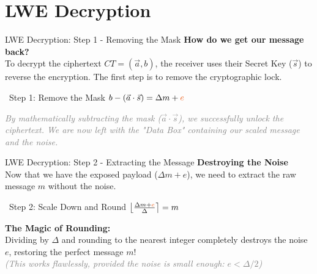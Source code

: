 \documentclass[aspectratio=169, 10pt]{beamer}
\begin{document}
\section{LWE Decryption}
\begin{frame}{LWE Decryption: Step 1 - Removing the Mask}
    \Large
    \textbf{How do we get our message back?} \\
    \vspace{0.2cm}
    \normalsize
    To decrypt the ciphertext ${CT = (\vec{a}, b)}$, the receiver uses their Secret Key ($\vec{s}$) to reverse the encryption. The first step is to remove the cryptographic lock.
    \vspace{0.4cm}
    
    \begin{block}{\faUnlock \ Step 1: Remove the Mask}
        \centering
        \vspace{0.2cm}
        \Large $b - (\vec{a} \cdot \vec{s}) = \Delta m + \textcolor{AccentOrange}{{e}}$
        \vspace{0.2cm}
    \end{block}
    \vspace{0.4cm}
    
    \begin{center}
        \textit{\textcolor{gray}{By mathematically subtracting the mask ($\vec{a} \cdot \vec{s}$), we successfully unlock the ciphertext. We are now left with the "Data Box" containing our scaled message and the noise.}}
    \end{center}
\end{frame}

\begin{frame}{LWE Decryption: Step 2 - Extracting the Message}
    \Large
    \textbf{Destroying the Noise} \\
    \vspace{0.2cm}
    \normalsize
    Now that we have the exposed payload ($\Delta m + e$), we need to extract the raw message $m$ without the noise.
    \vspace{0.4cm}
    
    \begin{exampleblock}{\faCheckCircle \ Step 2: Scale Down and Round}
        \centering
        \vspace{0.2cm}
        \Large $\left\lfloor \frac{\Delta m + \textcolor{AccentOrange}{{e}}}{\Delta} \right\rceil = m$
        \vspace{0.2cm}
    \end{exampleblock}
    \vspace{0.4cm}
    
    \begin{center}
        \textbf{The Magic of Rounding:} \\
        Dividing by $\Delta$ and rounding to the nearest integer completely destroys the noise $e$, restoring the perfect message $m$! \\
        \vspace{0.3cm}
        \textit{\textcolor{gray}{\small (This works flawlessly, provided the noise is small enough: $e < \Delta / 2$)}}
    \end{center}
\end{frame}
\end{document}
